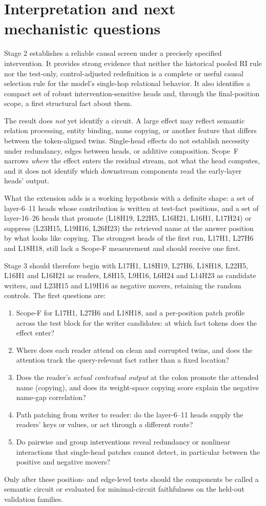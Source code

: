\documentclass[11pt,a4paper]{article}
\begin{document}
\section{Interpretation and next mechanistic questions}
Stage 2 establishes a reliable causal screen under a precisely specified
intervention. It provides strong evidence that neither the historical pooled RI
rule nor the test-only, control-adjusted redefinition is a complete or useful
causal selection rule for the model's single-hop relational behavior. It also
identifies a compact set of robust intervention-sensitive heads and, through the
final-position scope, a first structural fact about them.

The result does \emph{not} yet identify a circuit. A large effect may reflect
semantic relation processing, entity binding, name copying, or another feature
that differs between the token-aligned twins. Single-head effects do not
establish necessity under redundancy, edges between heads, or additive
composition. Scope~F narrows \emph{where} the effect enters the residual stream,
not what the head computes, and it does not identify which downstream components
read the early-layer heads' output.

What the extension adds is a working hypothesis with a definite shape: a set of
layer-6--11 heads whose contribution is written at test-fact positions, and a set
of layer-16--26 heads that promote (L18H19, L22H5, L16H21, L16H1, L17H24) or
suppress (L23H15, L19H16, L26H23) the retrieved name at the answer position by
what looks like copying. The strongest heads of the first run, L17H1, L27H6 and
L18H18, still lack a Scope-F measurement and should receive one first.

Stage 3 should therefore begin with L17H1, L18H19, L27H6, L18H18, L22H5, L16H1
and L16H21 as readers, L8H15, L9H16, L6H24 and L14H23 as candidate writers, and
L23H15 and L19H16 as negative movers, retaining the random controls. The first
questions are:
\begin{enumerate}
\item Scope-F for L17H1, L27H6 and L18H18, and a per-position patch profile
across the test block for the writer candidates: at which fact tokens does the
effect enter?
\item Where does each reader attend on clean and corrupted twins, and does the
attention track the query-relevant fact rather than a fixed location?
\item Does the reader's \emph{actual contextual output} at the colon promote the
attended name (copying), and does its weight-space copying score explain the
negative name-gap correlation?
\item Path patching from writer to reader: do the layer-6--11 heads supply the
readers' keys or values, or act through a different route?
\item Do pairwise and group interventions reveal redundancy or nonlinear
interactions that single-head patches cannot detect, in particular between the
positive and negative movers?
\end{enumerate}
Only after these position- and edge-level tests should the components be called
a semantic circuit or evaluated for minimal-circuit faithfulness on the held-out
validation families.
\end{document}
